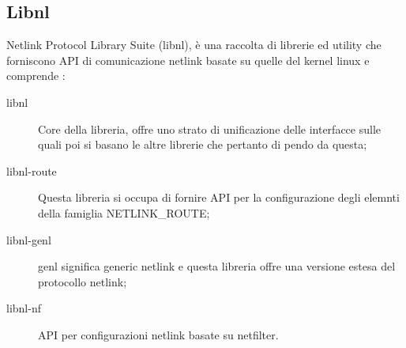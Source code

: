 \subsection{Libnl}
Netlink Protocol Library Suite (libnl), \`e una raccolta di librerie ed utility che forniscono API di comunicazione netlink basate su quelle del kernel linux e comprende \cite{K10}:
\begin{description}                     %
  \item[libnl] Core della libreria, offre uno strato di unificazione delle interfacce sulle quali poi si basano le altre librerie che pertanto di pendo da questa;
  \item[libnl-route] Questa libreria si occupa di fornire API per la configurazione degli elemnti della famiglia NETLINK\_ROUTE;
  \item[libnl-genl] genl significa generic netlink e questa libreria offre una versione estesa del protocollo netlink;
  \item[libnl-nf] API per configurazioni netlink basate su netfilter.

\end{description}

\clearpage{\pagestyle{empty}\cleardoublepage}
